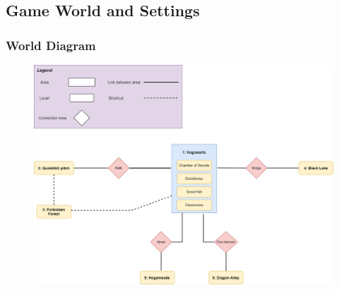 \subsection{Game World and Settings}

\subsubsection{World Diagram}
\begin{figure}[H]
\includegraphics[max width=\textwidth]{../Pictures/Maps/World_diagram.png}
\end{figure}


